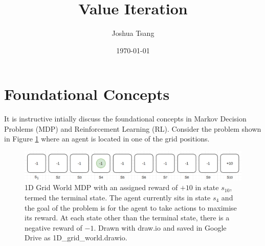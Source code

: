 \documentclass[a4paper,11pt]{article}
\title{Value Iteration}
\author{Joshua Tsang}
\date{\today}
\begin{document}
\maketitle
\tableofcontents

\section{Foundational Concepts}

It is instructive intially discuss the foundational concepts in Markov Decision Problems (MDP) and Reinforcement Learning (RL).  Consider the problem shown in Figure \ref{fig:1d-grid-world-problem-statement} where an agent is located in one of the grid positions.

\begin{figure}
    \includegraphics[width=\textwidth]{images/1d-grid-world-problem-statement.png}
    \caption{1D Grid World MDP with an assigned reward of $+10$ in state $s_{10}$, termed the terminal state.  The agent currently sits in state $s_4$ and the goal of the problem is for the agent to take actions to maximise its reward.  At each state other than the terminal state, there is a negative reward of $-1$.  Drawn with draw.io and saved in Google Drive as 1D\_grid\_world.drawio.}
    \label{fig:1d-grid-world-problem-statement}
\end{figure}
\end{document}

